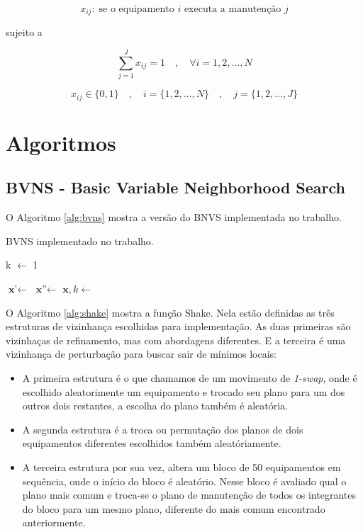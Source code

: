 \documentclass[
	12pt,				%
	oneside,			%
	a4paper,			%
	chapter=TITLE,
	sumario=tradicional,
	english,			%
	brazil				%
]{abntex2}
\newcommand{\un}[1]{\;\text{#1}}
\begin{document}
\[  x_{ij}: \un{se o equipamento $i$ executa a manutenção $j$}  \]


\noindent sujeito a

\[ \sum_{j=1}^{J} x_{ij} = 1 \quad , \quad \forall i = {1, 2, ..., N} \]

\[ x_{ij} \in \{0,1\} \quad , \quad i = \{1, 2, ..., N\}  \quad , \quad j = \{1, 2, ..., J\} \]


\chapter{Algoritmos}\label{cap:algoritmos} 

\section{BVNS - Basic Variable Neighborhood Search}

O Algoritmo \ref{alg:bvns} mostra a versão do BNVS implementada 
no trabalho.

\begin{algorithm}[H]
	\caption{BVNS implementado no trabalho.}\label{alg:bvns}
	\begin{algorithmic}[1]
			\State k $\gets$ 1

				\State $ \textbf{x'} \gets$  
				\State $ \textbf{x''} \gets$  
				\State $ \textbf{x}, k \gets$  
			\EndWhile
		\EndWhile
	\EndProcedure 
	\end{algorithmic}
\end{algorithm}

O Algoritmo \ref{alg:shake} mostra a função Shake. Nela estão definidas as três estruturas de vizinhança escolhidas para implementação. As duas primeiras
são vizinhaças de refinamento, mas com abordagens diferentes. E a terceira é uma vizinhança de perturbação para buscar sair de mínimos locais:
\begin{itemize}
	\item A primeira estrutura é o que chamamos de um movimento de \textit{1-swap}, onde é escolhido aleatorimente um equipamento e trocado seu plano para um dos outros dois
	restantes, a escolha do plano também é aleatória.
	\item A segunda estrutura é a troca ou permutação dos planos de dois equipamentos diferentes escolhidos também aleatóriamente.
	\item A terceira estrutura por sua vez, altera um bloco de 50 equipamentos em sequência, onde o início do bloco é aleatório. Nesse bloco é avaliado qual o plano mais comum
	e troca-se o plano de manutenção de todos os integrantes do bloco para um mesmo plano, diferente do mais comum encontrado anteriormente.
\end{itemize}
\end{document}
